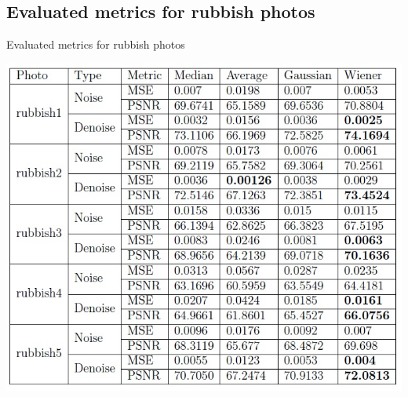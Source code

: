 \documentclass{beamer}
\begin{document}
\subsection{Evaluated metrics for rubbish photos}
\begin{frame}{Evaluated metrics for rubbish photos}
\begin{center}
\includegraphics{rub1.jpg}
\end{center}


\end{frame}
\end{document}
